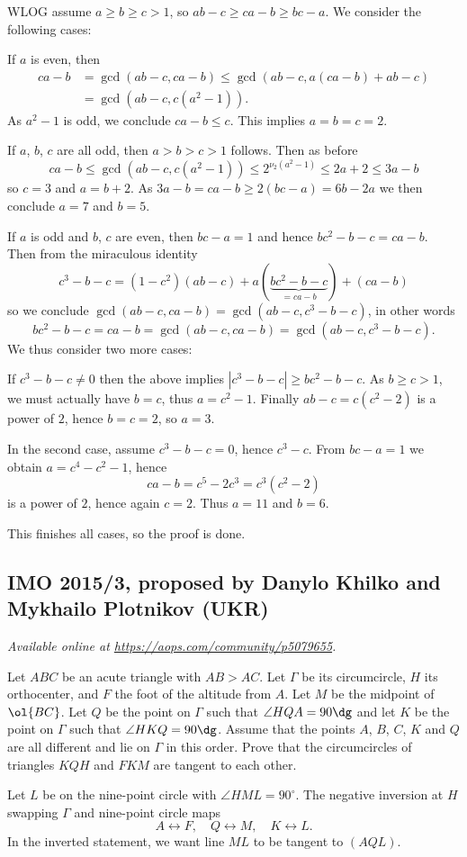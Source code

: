 \documentclass[11pt]{scrartcl}
\begin{document}
WLOG assume $a \ge b \ge c > 1$, so $ab-c \ge ca-b \ge bc-a$.
We consider the following cases:
\begin{itemize}
  \ii If $a$ is even, then
  \begin{align*}
    ca-b &= \gcd (ab-c, ca-b) \le \gcd (ab-c, a(ca-b)+ab-c) \\
    &= \gcd\left( ab-c, c(a^2-1) \right).
  \end{align*}
  As $a^2-1$ is odd, we conclude $ca-b \le c$.
  This implies $a=b=c=2$.

  \ii If $a$, $b$, $c$ are all odd, then $a > b > c > 1$ follows.
  Then as before
  \[  ca-b \le \gcd (ab-c, c(a^2-1))
    \le 2^{\nu_2(a^2-1)} \le 2a+2 \le 3a-b \]
  so $c = 3$ and $a = b+2$.
  As $3a-b = ca-b \ge 2(bc-a) = 6b-2a$ we then conclude $a=7$ and $b=5$.

  \ii If $a$ is odd and $b$, $c$ are even, then $bc-a=1$
  and hence $bc^2 - b - c = ca - b$.
  Then from the miraculous identity
  \[ c^3-b-c = (1-c^2)(ab-c) + a(\underbrace{bc^2-b-c}_{=ca-b}) + (ca-b) \]
  so we conclude $\gcd(ab-c, ca-b) = \gcd(ab-c, c^3-b-c)$, in other words
  \[ bc^2-b-c = ca-b = \gcd(ab-c, ca-b) = \gcd(ab-c, c^3-b-c). \]
  We thus consider two more cases:
  \begin{itemize}
    \ii If $c^3-b-c \neq 0$ then
    the above implies $|c^3-b-c| \ge bc^2-b-c$.
    As $b \ge c > 1$, we must actually have $b = c$,
    thus $a = c^2-1$.
    Finally $ab-c = c(c^2-2)$ is a power of $2$, hence $b=c=2$, so $a=3$.

    \ii In the second case, assume $c^3-b-c = 0$, hence $c^3-c$.
    From $bc-a=1$ we obtain $a=c^4-c^2-1$,
    hence
    \[ ca-b = c^5-2c^3 = c^3(c^2-2) \]
    is a power of $2$, hence again $c = 2$.
    Thus $a=11$ and $b=6$.
  \end{itemize}
\end{itemize}
This finishes all cases, so the proof is done.
\pagebreak

\subsection{IMO 2015/3, proposed by Danylo Khilko and Mykhailo Plotnikov (UKR)}
\textsl{Available online at \url{https://aops.com/community/p5079655}.}
\begin{mdframed}[style=mdpurplebox,frametitle={Problem statement}]
Let $ABC$ be an acute triangle with $AB > AC$.
Let $\Gamma$ be its circumcircle, $H$ its orthocenter, and $F$ the foot of the altitude from $A$.
Let $M$ be the midpoint of $\ol{BC}$.
Let $Q$ be the point on $\Gamma$ such that $\angle HQA = 90\dg$
and let $K$ be the point on $\Gamma$ such that $\angle HKQ = 90\dg$.
Assume that the points $A$, $B$, $C$, $K$ and $Q$ are all different and lie on $\Gamma$ in this order.
Prove that the circumcircles of triangles $KQH$ and $FKM$ are tangent to each other.
\end{mdframed}
Let $L$ be on the nine-point circle with $\angle HML = 90^{\circ}$.
The negative inversion at $H$ swapping $\Gamma$ and nine-point circle maps
\[ A \longleftrightarrow F, \quad
  Q \longleftrightarrow M, \quad
  K \longleftrightarrow L. \]
In the inverted statement, we want line $ML$ to be tangent to $(AQL)$.
\end{document}
